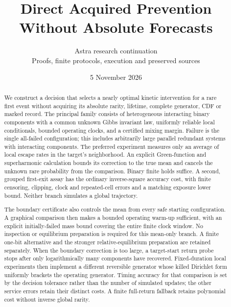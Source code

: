\documentclass[11pt,a4paper]{article}
\title{Direct Acquired Prevention\\Without Absolute Forecasts}
\author{Astra research continuation\\Proofs, finite protocols, execution and preserved sources}
\date{5 November 2026}
\begin{document}
\maketitle
\begin{abstract}
We construct a decision that selects a nearly optimal kinetic intervention for a rare first event without acquiring its absolute rarity, lifetime, complete generator, CDF or marked record. The principal family consists of heterogeneous interacting binary components with a common unknown Gibbs invariant law, uniformly reliable local conditionals, bounded operating clocks, and a certified mixing margin. Failure is the single all-failed configuration; this includes arbitrarily large parallel redundant systems with interacting components. The preferred experiment measures only an average of local escape rates in the target's neighborhood. An explicit Green-function and superharmonic calculation bounds its correction to the true mean and cancels the unknown rare probability from the comparison. Binary finite holds suffice. A second, grouped first-exit assay has the ordinary inverse-square accuracy cost, with finite censoring, clipping, clock and repeated-cell errors and a matching exposure lower bound. Neither branch simulates a global trajectory.

The boundary certificate also controls the mean from every safe starting configuration. A graphical comparison then makes a bounded operating warm-up sufficient, with an explicit initially-failed mass bound covering the entire finite clock window. No inspection or equilibrium preparation is required for this mean-only branch. A finite one-bit alternative and the stronger relative-equilibrium preparation are retained separately. When the boundary correction is too large, a target-start return probe stops after only logarithmically many components have recovered. Fixed-duration local experiments then implement a different reversible generator whose killed Dirichlet form uniformly brackets the operating generator. Timing accuracy for that comparison is set by the decision tolerance rather than the number of simulated updates; the other service errors retain their distinct costs. A finite full-return fallback retains polynomial cost without inverse global rarity.


\end{abstract}
\end{document}
